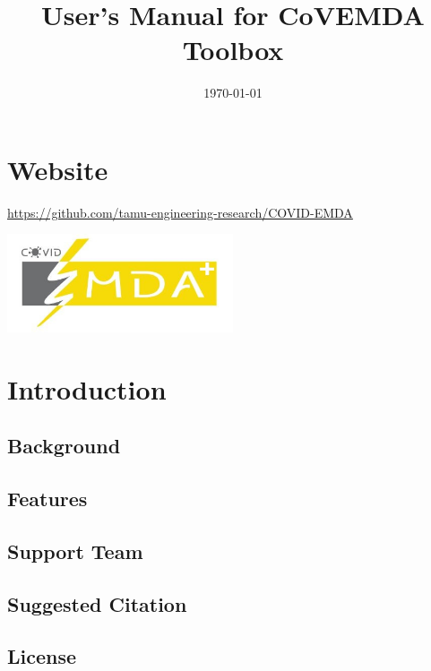 \documentclass[11pt]{article}
\title{User's Manual for CoVEMDA Toolbox}
\author{}
\date{\today}
\numberwithin{equation}{section}
\numberwithin{table}{section}
\numberwithin{figure}{section}
\begin{document}
\maketitle
\thispagestyle{empty}
\newpage
\tableofcontents
\thispagestyle{empty}


\newpage
\setcounter{page}{1}
\section*{Website}

\url{https://github.com/tamu-engineering-research/COVID-EMDA}

\begin{center}
	\noindent\includegraphics[width=0.5\textwidth]{figures/covid_emda_logo.JPG}
\end{center}



\newpage
\section{Introduction} \label{sec:intro}

\subsection{Background}

\subsection{Features}

\subsection{Support Team}

\subsection{Suggested Citation}

\subsection{License}
\begin{Notice}
	
\end{Notice}
\end{document}

